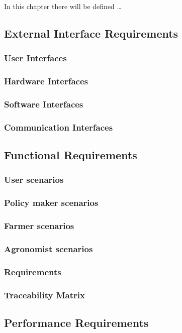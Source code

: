 In this chapter there will be defined \ldots


\subsection{External Interface Requirements}
\subsubsection{User Interfaces}
\subsubsection{Hardware Interfaces}
\subsubsection{Software Interfaces}
\subsubsection{Communication Interfaces}


\subsection{Functional Requirements}
\subsubsection{User scenarios}
\subsubsection{Policy maker scenarios}
\subsubsection{Farmer scenarios}
\subsubsection{Agronomist scenarios}
\subsubsection{Requirements}
\subsubsection{Traceability Matrix}

\subsection{Performance Requirements}


